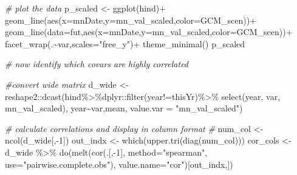 \documentclass[
]{article}
\newenvironment{Shaded}{\begin{snugshade}}{\end{snugshade}}
\newcommand{\AttributeTok}[1]{\textcolor[rgb]{0.77,0.63,0.00}{#1}}
\newcommand{\CommentTok}[1]{\textcolor[rgb]{0.56,0.35,0.01}{\textit{#1}}}
\newcommand{\DecValTok}[1]{\textcolor[rgb]{0.00,0.00,0.81}{#1}}
\newcommand{\FunctionTok}[1]{\textcolor[rgb]{0.00,0.00,0.00}{#1}}
\newcommand{\NormalTok}[1]{#1}
\newcommand{\OtherTok}[1]{\textcolor[rgb]{0.56,0.35,0.01}{#1}}
\newcommand{\SpecialCharTok}[1]{\textcolor[rgb]{0.00,0.00,0.00}{#1}}
\newcommand{\StringTok}[1]{\textcolor[rgb]{0.31,0.60,0.02}{#1}}
\begin{document}
\begin{Shaded}
\begin{Highlighting}[]
      \CommentTok{\# plot the data}
\NormalTok{       p\_scaled }\OtherTok{\textless{}{-}} \FunctionTok{ggplot}\NormalTok{(hind)}\SpecialCharTok{+}
         \FunctionTok{geom\_line}\NormalTok{(}\FunctionTok{aes}\NormalTok{(}\AttributeTok{x=}\NormalTok{mnDate,}\AttributeTok{y=}\NormalTok{mn\_val\_scaled,}\AttributeTok{color=}\NormalTok{GCM\_scen))}\SpecialCharTok{+}
         \FunctionTok{geom\_line}\NormalTok{(}\AttributeTok{data=}\NormalTok{fut,}\FunctionTok{aes}\NormalTok{(}\AttributeTok{x=}\NormalTok{mnDate,}\AttributeTok{y=}\NormalTok{mn\_val\_scaled,}\AttributeTok{color=}\NormalTok{GCM\_scen))}\SpecialCharTok{+}
         \FunctionTok{facet\_wrap}\NormalTok{(.}\SpecialCharTok{\textasciitilde{}}\NormalTok{var,}\AttributeTok{scales=}\StringTok{"free\_y"}\NormalTok{)}\SpecialCharTok{+}
         \FunctionTok{theme\_minimal}\NormalTok{()}
\NormalTok{      p\_scaled}
      
      \CommentTok{\# now identify which covars are highly correlated}
      
      \CommentTok{\#convert wide matrix}
\NormalTok{      d\_wide   }\OtherTok{\textless{}{-}}\NormalTok{ reshape2}\SpecialCharTok{::}\FunctionTok{dcast}\NormalTok{(hind}\SpecialCharTok{\%\textgreater{}\%}\NormalTok{dplyr}\SpecialCharTok{::}\FunctionTok{filter}\NormalTok{(year}\SpecialCharTok{!=}\NormalTok{thisYr)}\SpecialCharTok{\%\textgreater{}\%}
                                    \FunctionTok{select}\NormalTok{(year, var, mn\_val\_scaled),}
\NormalTok{                                 year}\SpecialCharTok{\textasciitilde{}}\NormalTok{var,mean,}
                                 \AttributeTok{value.var =} \StringTok{"mn\_val\_scaled"}\NormalTok{)}
      
    
      \CommentTok{\# calculate correlations and display in column format}
      \CommentTok{\#}
\NormalTok{      num\_col  }\OtherTok{\textless{}{-}} \FunctionTok{ncol}\NormalTok{(d\_wide[,}\SpecialCharTok{{-}}\DecValTok{1}\NormalTok{])}
\NormalTok{      out\_indx }\OtherTok{\textless{}{-}} \FunctionTok{which}\NormalTok{(}\FunctionTok{upper.tri}\NormalTok{(}\FunctionTok{diag}\NormalTok{(num\_col))) }
\NormalTok{      cor\_cols }\OtherTok{\textless{}{-}}\NormalTok{ d\_wide }\SpecialCharTok{\%\textgreater{}\%}
                  \FunctionTok{do}\NormalTok{(}\FunctionTok{melt}\NormalTok{(}\FunctionTok{cor}\NormalTok{(.[,}\SpecialCharTok{{-}}\DecValTok{1}\NormalTok{], }
                              \AttributeTok{method=}\StringTok{"spearman"}\NormalTok{, }
                              \AttributeTok{use=}\StringTok{"pairwise.complete.obs"}\NormalTok{),}
                          \AttributeTok{value.name=}\StringTok{"cor"}\NormalTok{)[out\_indx,])}


\end{Highlighting}
\end{Shaded}
\end{document}
